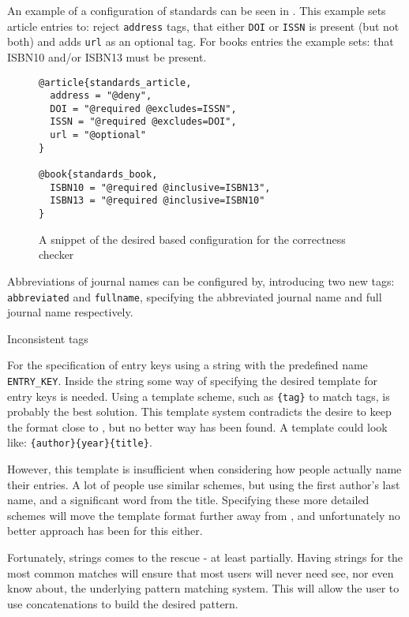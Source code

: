 An example of a configuration of standards can be seen in
.  This example sets article
entries to: reject \texttt{address} tags, that either \texttt{DOI} or
\texttt{ISSN} is present (but not both) and adds \texttt{url} as an
optional tag.  For books entries the example sets: that ISBN10 and/or
ISBN13 must be present.

\begin{figure}
  \centering
\begin{verbatim}
@article{standards_article,
  address = "@deny",
  DOI = "@required @excludes=ISSN",
  ISSN = "@required @excludes=DOI",
  url = "@optional"
}

@book{standards_book,
  ISBN10 = "@required @inclusive=ISBN13",
  ISBN13 = "@required @inclusive=ISBN10"
}
\end{verbatim}
  \caption{A snippet of the desired {\bibtex} based configuration for the correctness checker}
  \label{fig:analyzing_standards_config}
\end{figure}

Abbreviations of journal names can be configured by, introducing two
new tags: \texttt{abbreviated} and \texttt{fullname}, specifying the
abbreviated journal name and full journal name respectively.


Inconsistent tags

For the specification of entry keys using a {\bibtex} string with the
predefined name \texttt{ENTRY\_KEY}.  Inside the string some way of
specifying the desired template for entry keys is needed.  Using a
template scheme, such as \texttt{\{tag\}} to match tags, is probably
the best solution.  This template system contradicts the desire to
keep the format close to {\bibtex}, but no better way has been found.
A template could look like: \texttt{\{author\}\{year\}\{title\}}.

However, this template is insufficient when considering how people
actually name their entries.  A lot of people use similar schemes, but
using the first author's last name, and a significant word from the
title.  Specifying these more detailed schemes will move the template
format further away from {\bibtex}, and unfortunately no better
approach has been for this either. 

Fortunately, {\bibtex} strings comes to the rescue - at least
partially.  Having strings for the most common matches will ensure
that most users will never need see, nor even know about, the
underlying pattern matching system.  This will allow the user to use
concatenations to build the desired pattern.


